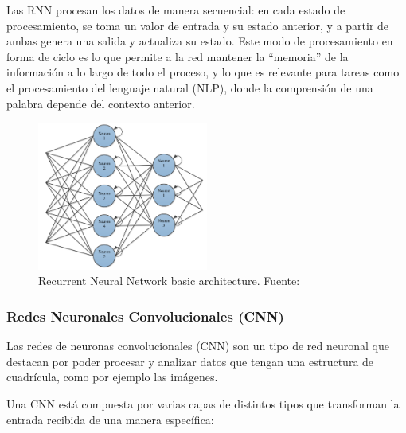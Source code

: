 \documentclass[12pt]{report} %
\begin{document}
Las RNN procesan los datos de manera secuencial: en cada estado de procesamiento, se toma un valor de entrada y su estado anterior, y a partir de ambas genera una salida y actualiza su estado. Este modo de procesamiento en forma de ciclo es lo que permite a la red mantener la “memoria” de la información a lo largo de todo el proceso, y lo que es relevante para tareas como el procesamiento del lenguaje natural (NLP), donde la comprensión de una palabra depende del contexto anterior.

\begin{figure}[H]
	\centering
	\includegraphics[width=0.5\textwidth]{rnnStructure.png}
	\caption{Recurrent Neural Network basic architecture. Fuente: \cite{annReview}}
	\label{fig:imagen26}
\end{figure}

\subsubsection{Redes Neuronales Convolucionales (CNN)}

Las  redes de neuronas convolucionales (CNN) son un tipo de red neuronal que destacan por poder procesar y analizar datos que tengan una estructura de cuadrícula, como por ejemplo las imágenes. 
\cite{artInt} \cite{annReview}

Una CNN está compuesta por varias capas de distintos tipos que transforman la entrada recibida de una manera específica:
\end{document}
